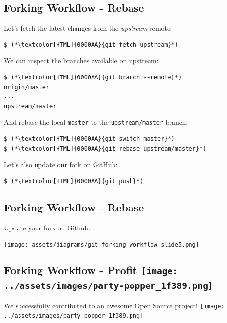 \subsection{Forking Workflow - Rebase}
\begin{frame}[fragile]
  \subslidetitle

  Let's fetch the latest changes from the \textit{upstream} remote:

  \begin{lstlisting}
$ (*\textcolor[HTML]{0000AA}{git fetch upstream}*)
\end{lstlisting}

  We can inspect the branches available on upstream:

  \begin{lstlisting}
$ (*\textcolor[HTML]{0000AA}{git branch --remote}*)
origin/master
...
upstream/master
\end{lstlisting}

  And rebase the local \lstinline{master} to the \lstinline{upstream/master} branch:

  \begin{lstlisting}
$ (*\textcolor[HTML]{0000AA}{git switch master}*)
$ (*\textcolor[HTML]{0000AA}{git rebase upstream/master}*)
\end{lstlisting}

  Let's also update our fork on GitHub:

  \begin{lstlisting}
$ (*\textcolor[HTML]{0000AA}{git push}*)
\end{lstlisting}

\end{frame}

\subsection{Forking Workflow - Rebase}
\begin{frame}[fragile]
  \subslidetitle
  Update your fork on Github.

  \vspace{2em}
  \centerline{\texttt{[image: assets/diagrams/git-forking-workflow-slide5.png]}}

\end{frame}

\subsection{Forking Workflow - Profit \texttt{[image: ../assets/images/party-popper\_1f389.png]}}
\begin{frame}[fragile]
  \subslidetitle

  \vspace{8em}
  \begin{center}
      We successfully contributed to an awesome Open Source project! \texttt{[image: ../assets/images/party-popper\_1f389.png]}
  \end{center}

\end{frame}

